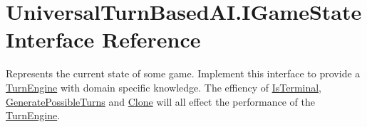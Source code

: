\hypertarget{interface_universal_turn_based_a_i_1_1_i_game_state}{}\section{Universal\+Turn\+Based\+A\+I.\+I\+Game\+State Interface Reference}
\label{interface_universal_turn_based_a_i_1_1_i_game_state}


Represents the current state of some game. Implement this interface to provide a \hyperlink{class_universal_turn_based_a_i_1_1_turn_engine}{Turn\+Engine} with domain specific knowledge. The effiency of \hyperlink{interface_universal_turn_based_a_i_1_1_i_game_state_ac6c55bbcda732fbae17d4fa686258a57}{Is\+Terminal}, \hyperlink{interface_universal_turn_based_a_i_1_1_i_game_state_a1f0360d2154d764f124e1d83b67b21c4}{Generate\+Possible\+Turns} and \hyperlink{interface_universal_turn_based_a_i_1_1_i_game_state_a0a89b8e0ff0821f4715dcca7b612c6be}{Clone} will all effect the performance of the \hyperlink{class_universal_turn_based_a_i_1_1_turn_engine}{Turn\+Engine}.  


